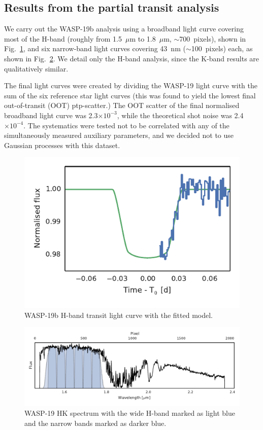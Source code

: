 \documentclass[useAMS,usenatbib]{mn2e}
\begin{document}
\subsection{Results from the partial transit analysis}
\label{sec:wasp_19b:true_analysis}
We carry out the WASP-19b analysis using a broadband light curve covering most of the H-band (roughly from 1.5~$\mu$m to
1.8~$\mu$m, $\sim$700~pixels), shown in Fig.~\ref{fig:wasp_19b_lc_h}, and six narrow-band light curves covering 43~nm
($\sim$100~pixels) each, as shown in Fig.~\ref{fig:wasp_19b_spectrum_h}. We detail only the H-band analysis, since the
K-band results are qualitatively similar. 

The final light curves were created by dividing the \mbox{WASP-19} light curve with the sum of the six reference star
light curves (this was found to yield the lowest final out-of-transit (OOT) ptp-scatter.) The OOT scatter of the final
normalised broadband light curve was 2.3$\times 10^{-3}$, while the theoretical shot noise was 2.4$\times 10^{-4}$. The
systematics were tested not to be correlated with any of the simultaneously measured auxiliary parameters, and we
decided not to use Gaussian processes with this dataset.

\begin{figure}
 \centering
 \includegraphics[width=\columnwidth]{wasp_19_h_lc.pdf}
 \caption{WASP-19b H-band transit light curve with the fitted model.}
 \label{fig:wasp_19b_lc_h}
\end{figure}

\begin{figure}[t!]
 \centering
 \includegraphics[width=\textwidth]{wasp_19_spectrum_h.pdf}
 \caption{WASP-19 HK spectrum with the wide H-band marked as light blue and the narrow bands marked as darker blue.}
 \label{fig:wasp_19b_spectrum_h}
\end{figure}
\end{document}
